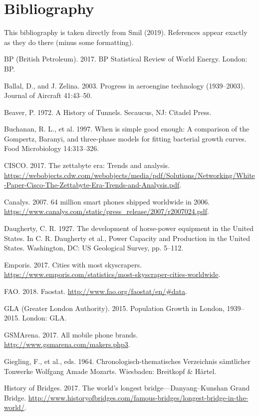 \section*{Bibliography}

This bibliography is taken directly from Smil (2019). References appear exactly as they do there (minus some formatting). \par\par

BP (British Petroleum). 2017. BP Statistical Review of World Energy. London: BP.\par
Ballal, D., and J. Zelina. 2003. Progress in aeroengine technology (1939–2003). Journal of Aircraft 41:43–50.\par
Beaver, P. 1972. A History of Tunnels. Secaucus, NJ: Citadel Press.\par
Buchanan, R. L., et al. 1997. When is simple good enough: A comparison of the Gompertz, Baranyi, and three-phase models for fitting bacterial growth curves. Food Microbiology 14:313–326.\par
CISCO. 2017. The zettabyte era: Trends and analysis. \url{https://webobjects.cdw.com/webobjects/media/pdf/Solutions/Networking/White-Paper-Cisco-The-Zettabyte-Era-Trends-and-Analysis.pdf}.\par
Canalys. 2007. 64 million smart phones shipped worldwide in 2006. \url{https://www.canalys.com/static/press_release/2007/r2007024.pdf}.\par
Daugherty, C. R. 1927. The development of horse-power equipment in the United States. In C. R. Daugherty et al., Power Capacity and Production in the United States. Washington, DC: US Geological Survey, pp. 5–112.\par
Emporis. 2017. Cities with most skyscrapers. \url{https://www.emporis.com/statistics/most-skyscraper-cities-worldwide}.\par
FAO. 2018. Faostat. \url{http://www.fao.org/faostat/en/#data}.\par
GLA (Greater London Authority). 2015. Population Growth in London, 1939–2015. London: GLA.\par
GSMArena. 2017. All mobile phone brands. \url{http://www.gsmarena.com/makers.php3}.\par
Giegling, F., et al., eds. 1964. Chronologisch-thematisches Verzeichnis sämtlicher Tonwerke Wolfgang Amade Mozarts. Wiesbaden: Breitkopf \& Härtel.\par
History of Bridges. 2017. The world’s longest bridge—Danyang–Kunshan Grand Bridge. \url{http://www.historyofbridges.com/famous-bridges/longest-bridge-in-the-world/}.\par
